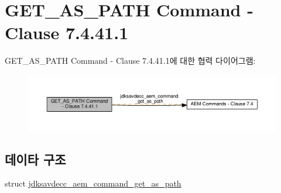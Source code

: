 \hypertarget{group__command__get__as__path}{}\section{G\+E\+T\+\_\+\+A\+S\+\_\+\+P\+A\+TH Command -\/ Clause 7.4.41.1}
\label{group__command__get__as__path}
G\+E\+T\+\_\+\+A\+S\+\_\+\+P\+A\+TH Command -\/ Clause 7.4.41.1에 대한 협력 다이어그램\+:
\nopagebreak
\begin{figure}[H]
\begin{center}
\leavevmode
\includegraphics[width=350pt]{group__command__get__as__path}
\end{center}
\end{figure}
\subsection*{데이타 구조}
\begin{DoxyCompactItemize}
\item 
struct \hyperlink{structjdksavdecc__aem__command__get__as__path}{jdksavdecc\+\_\+aem\+\_\+command\+\_\+get\+\_\+as\+\_\+path}
\end{DoxyCompactItemize}
